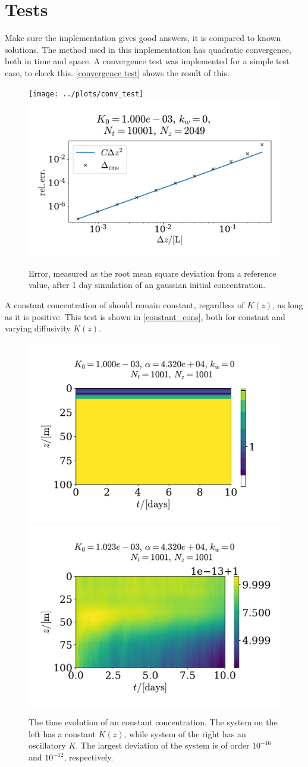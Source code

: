 \documentclass{article}
\begin{document}
    \section*{Tests}
    Make sure the implementation gives good answers, it is compared to known solutions. The method used in this implementation has quadratic convergence, both in time and space. A convergence test was implemented for a simple test case, to check this. \autoref{convergence test} shows the result of this. 

    \begin{figure}
        \centering
        \texttt{[image: ../plots/conv\_test]}
        \includegraphics[width=.49\textwidth]{../plots/conv_test_z}
        \caption{Error, measured as the root mean square deviation from a reference value, after 1 day simulation of an gaussian initial concentration.}
        \label{convergence test}
    \end{figure}

    A constant concentration of  should remain constant, regardless of $K(z)$, as long as it is positive. This test is shown in \autoref{constant_cons}, both for constant and varying diffusivity $K(z)$.

    \begin{figure}
        \centering
        \includegraphics[width=.49\textwidth]{../plots/test1}
        \includegraphics[width=.49\textwidth]{../plots/test1_varK}
        \caption{The time evolution of an constant concentration. The system on the left has a constant $K(z)$, while system of the right has an oscillatory $K$. The largest deviation of the system is of order $10^{-16}$ and $10^{-12}$, respectively.}
        \label{constant_cons}
    \end{figure}
\end{document}
